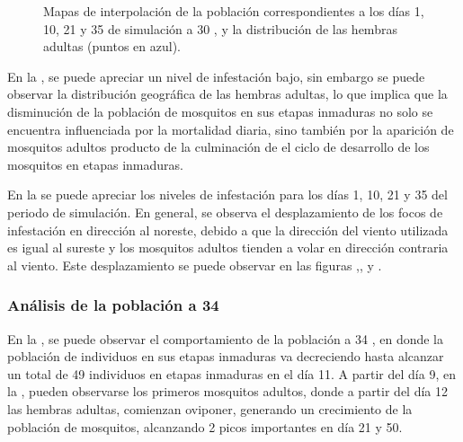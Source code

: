 \begin{figure}[!htbp]
    \caption{\label{fig:niveles-infestacion-30} Mapas de interpolación de la población correspondientes a los días 1, 10, 21 y 35 de simulación a 30 \textcelsius, y la distribución de las hembras adultas (puntos en azul). }
\end{figure}

En la , se puede apreciar un nivel de infestación bajo, sin
embargo se puede observar la distribución geográfica de las hembras adultas, lo que implica que la
disminución de la población de mosquitos en sus etapas inmaduras no solo se encuentra influenciada
por la mortalidad diaria, sino también por la aparición de mosquitos adultos producto de la culminación de el ciclo de desarrollo de los mosquitos en etapas inmaduras.

En la  se puede apreciar los niveles de infestación
para los días 1, 10, 21 y 35 del periodo de simulación. En general, se observa el
desplazamiento de los focos de infestación en dirección al noreste, debido a que la dirección del
viento utilizada es igual al sureste y los mosquitos adultos tienden a volar en dirección
contraria al viento. Este desplazamiento se puede observar en las figuras
,,
 y .

\subsubsection{Análisis de la población a 34\textcelsius}
En la , se puede observar el comportamiento de la población a
34 \textcelsius, en donde la población de individuos en sus etapas inmaduras va decreciendo hasta
alcanzar un total de 49 individuos en etapas inmaduras en el día 11. A partir del día 9, en la
, pueden observarse los primeros mosquitos adultos, donde a
partir del día 12 las hembras adultas, comienzan oviponer, generando un crecimiento de la
población de mosquitos, alcanzando 2 picos importantes en día 21 y 50.

